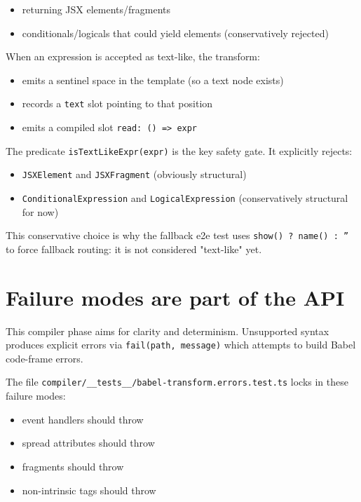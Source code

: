 \begin{itemize}
\item returning JSX elements/fragments
\item conditionals/logicals that could yield elements (conservatively rejected)
\end{itemize}

When an expression is accepted as text-like, the transform:

\begin{itemize}
\item emits a sentinel space in the template (so a text node exists)
\item records a \texttt{text} slot pointing to that position
\item emits a compiled slot \texttt{read: () => expr}
\end{itemize}

The predicate \texttt{isTextLikeExpr(expr)} is the key safety gate.
It explicitly rejects:

\begin{itemize}
\item \texttt{JSXElement} and \texttt{JSXFragment} (obviously structural)
\item \texttt{ConditionalExpression} and \texttt{LogicalExpression} (conservatively structural for now)
\end{itemize}

This conservative choice is why the fallback e2e test uses \texttt{show() ? name() : ''} to force fallback routing: it is not considered "text-like" yet.

\section{Failure modes are part of the API}

This compiler phase aims for clarity and determinism.
Unsupported syntax produces explicit errors via \texttt{fail(path, message)} which attempts to build Babel code-frame errors.

The file \texttt{compiler/\_\_tests\_\_/babel-transform.errors.test.ts} locks in these failure modes:

\begin{itemize}
\item event handlers should throw
\item spread attributes should throw
\item fragments should throw
\item non-intrinsic tags should throw
\end{itemize}

